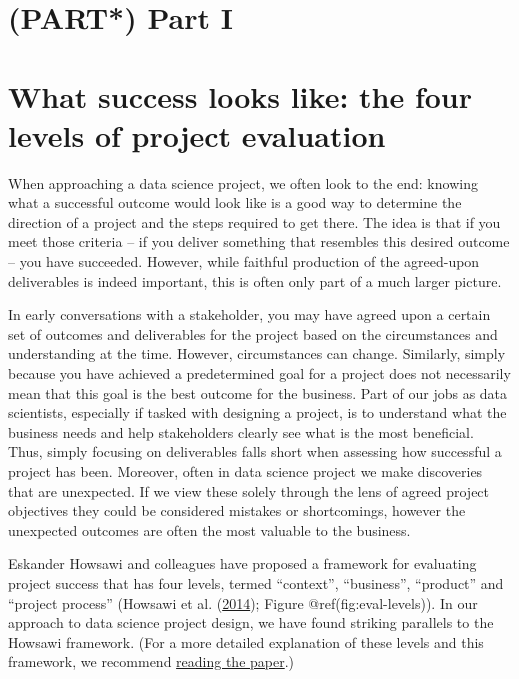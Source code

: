 \documentclass[]{book}
\begin{document}
\hypertarget{part-part-i}{%
\chapter*{(PART*) Part I}\label{part-part-i}}

\hypertarget{levels}{%
\chapter{What success looks like: the four levels of project
evaluation}\label{levels}}

When approaching a data science project, we often look to the end:
knowing what a successful outcome would look like is a good way to
determine the direction of a project and the steps required to get
there. The idea is that if you meet those criteria -- if you deliver
something that resembles this desired outcome -- you have succeeded.
However, while faithful production of the agreed-upon deliverables is
indeed important, this is often only part of a much larger picture.

In early conversations with a stakeholder, you may have agreed upon a
certain set of outcomes and deliverables for the project based on the
circumstances and understanding at the time. However, circumstances can
change. Similarly, simply because you have achieved a predetermined goal
for a project does not necessarily mean that this goal is the best
outcome for the business. Part of our jobs as data scientists,
especially if tasked with designing a project, is to understand what the
business needs and help stakeholders clearly see what is the most
beneficial. Thus, simply focusing on deliverables falls short when
assessing how successful a project has been. Moreover, often in data
science project we make discoveries that are unexpected. If we view
these solely through the lens of agreed project objectives they could be
considered mistakes or shortcomings, however the unexpected outcomes are
often the most valuable to the business.

Eskander Howsawi and colleagues have proposed a framework for evaluating
project success that has four levels, termed ``context'', ``business'',
``product'' and ``project process'' (Howsawi et al.
(\protect\hyperlink{ref-Howsawi}{2014}); Figure @ref(fig:eval-levels)).
In our approach to data science project design, we have found striking
parallels to the Howsawi framework. (For a more detailed explanation of
these levels and this framework, we recommend
\href{https://doi.org/10.5130/.v1i0.3865}{reading the paper}.)
\end{document}
